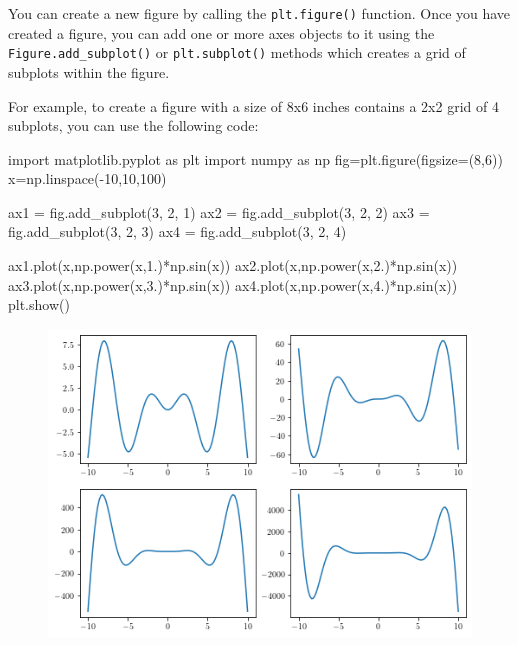 \documentclass[11pt]{article}
\newenvironment{Shaded}{}{}
\newcommand{\DecValTok}[1]{\textcolor[rgb]{0.25,0.63,0.44}{{#1}}}
\newcommand{\FloatTok}[1]{\textcolor[rgb]{0.25,0.63,0.44}{{#1}}}
\newcommand{\NormalTok}[1]{{#1}}
\newcommand{\ImportTok}[1]{{#1}}
\newcommand{\OperatorTok}[1]{\textcolor[rgb]{0.40,0.40,0.40}{{#1}}}
\begin{document}
You can create a new figure by calling the \texttt{plt.figure()}
function. Once you have created a figure, you can add one or more axes
objects to it using the \texttt{Figure.add\_subplot()} or
\texttt{plt.subplot()} methods which creates a grid of subplots within
the figure.

For example, to create a figure with a size of 8x6 inches contains a 2x2
grid of 4 subplots, you can use the following code:

\begin{Shaded}
\begin{Highlighting}[]
\ImportTok{import}\NormalTok{ matplotlib.pyplot }\ImportTok{as}\NormalTok{ plt}
\ImportTok{import}\NormalTok{ numpy }\ImportTok{as}\NormalTok{ np}
\NormalTok{fig}\OperatorTok{=}\NormalTok{plt.figure(figsize}\OperatorTok{=}\NormalTok{(}\DecValTok{8}\NormalTok{,}\DecValTok{6}\NormalTok{))}
\NormalTok{x}\OperatorTok{=}\NormalTok{np.linspace(}\OperatorTok{{-}}\DecValTok{10}\NormalTok{,}\DecValTok{10}\NormalTok{,}\DecValTok{100}\NormalTok{)}

\NormalTok{ax1 }\OperatorTok{=}\NormalTok{ fig.add\_subplot(}\DecValTok{3}\NormalTok{, }\DecValTok{2}\NormalTok{, }\DecValTok{1}\NormalTok{)}
\NormalTok{ax2 }\OperatorTok{=}\NormalTok{ fig.add\_subplot(}\DecValTok{3}\NormalTok{, }\DecValTok{2}\NormalTok{, }\DecValTok{2}\NormalTok{)}
\NormalTok{ax3 }\OperatorTok{=}\NormalTok{ fig.add\_subplot(}\DecValTok{3}\NormalTok{, }\DecValTok{2}\NormalTok{, }\DecValTok{3}\NormalTok{)}
\NormalTok{ax4 }\OperatorTok{=}\NormalTok{ fig.add\_subplot(}\DecValTok{3}\NormalTok{, }\DecValTok{2}\NormalTok{, }\DecValTok{4}\NormalTok{)}


\NormalTok{ax1.plot(x,np.power(x,}\FloatTok{1.}\NormalTok{)}\OperatorTok{*}\NormalTok{np.sin(x))}
\NormalTok{ax2.plot(x,np.power(x,}\FloatTok{2.}\NormalTok{)}\OperatorTok{*}\NormalTok{np.sin(x))}
\NormalTok{ax3.plot(x,np.power(x,}\FloatTok{3.}\NormalTok{)}\OperatorTok{*}\NormalTok{np.sin(x))}
\NormalTok{ax4.plot(x,np.power(x,}\FloatTok{4.}\NormalTok{)}\OperatorTok{*}\NormalTok{np.sin(x))}
\NormalTok{plt.show()}
\end{Highlighting}
\end{Shaded}

\begin{figure}
\centering
\includegraphics[scale=0.6]{addsubplot.png}
\end{figure}
\end{document}
